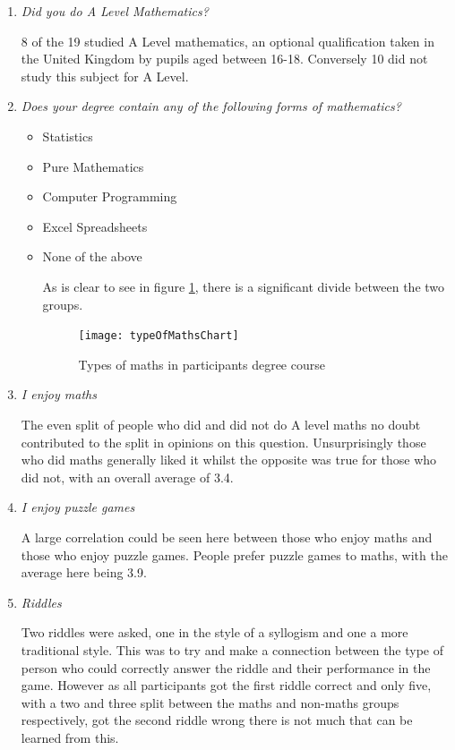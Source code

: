 \documentclass[12pt,a4paper]{report}
\begin{document}
\begin{enumerate}
	\item  \textit {Did you do A Level Mathematics?}
	
	8 of the 19 studied A Level mathematics, an optional qualification taken in the United Kingdom by pupils aged between 16-18. Conversely 10 did not study this subject for A Level.
	
	\item  \textit {Does your degree contain any of the following forms of mathematics?}
	\begin{itemize}
	\item Statistics
	\item Pure Mathematics
	\item Computer Programming
	\item Excel Spreadsheets
	\item None of the above
	
As is clear to see in figure \ref{fig:typeOfMathsChart}, there is a significant divide between the two groups.
	
\begin{figure}[h]
\centering
    \texttt{[image: typeOfMathsChart]}
    \caption{Types of maths in participants degree course}
        \label{fig:typeOfMathsChart}
\end{figure}
\FloatBarrier

\end{itemize}
	
	
	\item  \textit {I enjoy maths}
	
	The even split of people who did and did not do A level maths no doubt contributed to the split in opinions on this question. Unsurprisingly those who did maths generally liked it whilst the opposite was true for those who did not, with an overall average of 3.4.
	
	\item  \textit {I enjoy puzzle games}
	
	A large correlation could be seen here between those who enjoy maths and those who enjoy puzzle games. People prefer puzzle games to maths, with the average here being 3.9.
	
	\item  \textit {Riddles}
	
	Two riddles were asked, one in the style of a syllogism and one a more traditional style. This was to try and make a connection between the type of person who could correctly answer the riddle and their performance in the game. However as all participants got the first riddle correct and only five, with a two and three split between the maths and non-maths groups respectively, got the second riddle wrong there is not much that can be learned from this. 
	
	
\end{enumerate}
\end{document}

